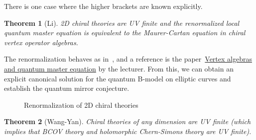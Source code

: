 \documentclass{amsart}
\newtheorem{thm}{Theorem}[section]
\theoremstyle{definition}
\theoremstyle{remark}
\theoremstyle{plain}
\theoremstyle{definition}
\theoremstyle{remark}
\newcommand{\1}{\mathbf{1}}
\newcommand{\2}{\mathbf{2}}
\newcommand{\3}{\mathbf{3}}
\begin{document}
There is one case where the higher brackets are known explicitly.

\begin{thm}[Li]
    2D chiral theories are UV finite and the renormalized local quantum master equation is equivalent to the Maurer-Cartan equation in chiral vertex operator algebras. 
\end{thm}

The renormalization behaves as in~, and a reference is the paper~\href{https://doi.org/10.4310/jdg/1683307007}{Vertex algebras and quantum master equation} by the lecturer. From this, we can obtain an explicit canonical solution for the quantum B-model on elliptic curves and establish the quantum mirror conjecture.

\begin{figure}[htpb]
\begin{center}
\end{center}
\caption{Renormalization of 2D chiral theories}%
\label{fig:renormalization}
\end{figure}



\begin{thm}[Wang-Yan]
    Chiral theories of any dimension are UV finite (which implies that BCOV theory and holomorphic Chern-Simons theory are UV finite).
\end{thm}
\end{document}
